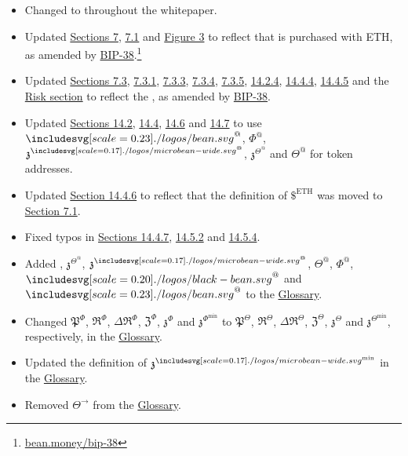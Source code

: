 \documentclass[class=article, crop=false]{standalone}
\begin{document}
\begin{itemize}[topsep=0pt, itemsep=3pt,leftmargin=16pt]
    \begin{itemize}
        \item Changed  to  throughout the whitepaper.
        \item Updated \hyperlink{section.7}{Sections 7}, \hyperlink{subsection.7.1}{7.1} and \hyperref[fig 3]{Figure 3} to reflect that  is purchased with ETH, as amended by \href{https://bean.money/bip-38}{BIP-38}.\footnote{\href{https://bean.money/bip-38}{bean.money/bip-38}}
        \item Updated \hyperlink{subsection.7.3}{Sections 7.3}, \hyperlink{subsubsection.7.3.1}{7.3.1}, \hyperlink{subsubsection.7.3.3}{7.3.3}, \hyperlink{subsubsection.7.3.4}{7.3.4}, \hyperlink{subsubsection.7.3.5}{7.3.5}, \hyperlink{subsubsection.14.2.4}{14.2.4}, \hyperlink{subsubsection.14.4.4}{14.4.4}, \hyperlink{subsubsection.14.4.5}{14.4.5} and the \hyperlink{section.12}{Risk section} to reflect the , as amended by \href{https://bean.money/bip-38}{BIP-38}.
        \item Updated \hyperlink{subsection.14.2}{Sections 14.2}, \hyperlink{subsection.14.4}{14.4}, \hyperlink{subsection.14.6}{14.6} and \hyperlink{subsection.14.7}{14.7} to use $\Bean^{@}$, $\Phi^{@}$, $\mathfrak{z}^{\bean^@}$, $\mathfrak{z}^{\Theta^@}$ and $\Theta^{@}$ for token addresses.
        \item Updated \hyperlink{subsubsection.14.4.6}{Section 14.4.6} to reflect that the definition of $\$^{\text{ETH}}$ was moved to \hyperlink{subsection.7.1}{Section 7.1}.
        \item Fixed typos in \hyperlink{subsubsection.14.4.7}{Sections 14.4.7}, \hyperlink{subsubsection.14.5.2}{14.5.2} and \hyperlink{subsubsection.14.5.4}{14.5.4}.
        \item Added , $\mathfrak{z}^{\Theta^@}$, $\mathfrak{z}^{\bean^@}$, $\Theta^{@}$, $\Phi^{@}$, $\Beanstalk^{@}$ and $\Bean^{@}$ to the \hyperlink{subsection.14.11}{Glossary}.
        \item Changed $\mathfrak{P}^{\Phi}$, $\mathfrak{R}^{\Phi}$, $\Delta \mathfrak{R}^{\Phi}$, $\mathfrak{Z}^{\Phi}$, $\mathfrak{z}^{\Phi}$ and $\mathfrak{z}^{\Phi^{\text{min}}}$ to $\mathfrak{P}^{\Theta}$, $\mathfrak{R}^{\Theta}$, $\Delta \mathfrak{R}^{\Theta}$, $\mathfrak{Z}^{\Theta}$, $\mathfrak{z}^{\Theta}$ and $\mathfrak{z}^{\Theta^{\text{min}}}$, respectively, in the \hyperlink{subsection.14.11}{Glossary}.
        \item Updated the definition of $\mathfrak{z}^{\bean^{\text{min}}}$ in the \hyperlink{subsection.14.11}{Glossary}.
        \item Removed $\Theta^{\rightarrow}$ from the \hyperlink{subsection.14.11}{Glossary}.
    \end{itemize}


\end{itemize}
\end{document}
